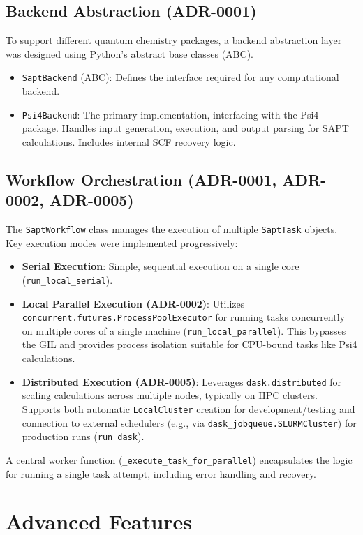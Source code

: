 \documentclass[12pt, a4paper]{report}
\begin{document}
\subsection{Backend Abstraction (ADR-0001)}
To support different quantum chemistry packages, a backend abstraction layer was designed using Python's abstract base classes (ABC).
\begin{itemize}
    \item \texttt{SaptBackend} (ABC): Defines the interface required for any computational backend.
    \item \texttt{Psi4Backend}: The primary implementation, interfacing with the Psi4 package. Handles input generation, execution, and output parsing for SAPT calculations. Includes internal SCF recovery logic.
\end{itemize}

\subsection{Workflow Orchestration (ADR-0001, ADR-0002, ADR-0005)}
The \texttt{SaptWorkflow} class manages the execution of multiple \texttt{SaptTask} objects. Key execution modes were implemented progressively:
\begin{itemize}
    \item \textbf{Serial Execution}: Simple, sequential execution on a single core (\texttt{run\_local\_serial}).
    \item \textbf{Local Parallel Execution (ADR-0002)}: Utilizes \texttt{concurrent.futures.ProcessPoolExecutor} for running tasks concurrently on multiple cores of a single machine (\texttt{run\_local\_parallel}). This bypasses the GIL and provides process isolation suitable for CPU-bound tasks like Psi4 calculations.
    \item \textbf{Distributed Execution (ADR-0005)}: Leverages \texttt{dask.distributed} for scaling calculations across multiple nodes, typically on HPC clusters. Supports both automatic \texttt{LocalCluster} creation for development/testing and connection to external schedulers (e.g., via \texttt{dask\_jobqueue.SLURMCluster}) for production runs (\texttt{run\_dask}).
\end{itemize}
A central worker function (\texttt{\_execute\_task\_for\_parallel}) encapsulates the logic for running a single task attempt, including error handling and recovery.

\section{Advanced Features}
\end{document}
